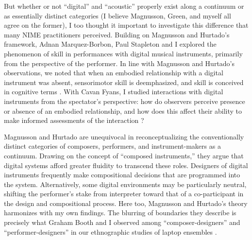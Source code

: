 But whether or not ``digital'' and ``acoustic'' properly exist along a continuum or as essentially distinct categories (I believe Magnusson, Green, and myself all agree on the former), I too thought it important to investigate this difference that many NIME practitioners perceived. Building on Magnusson and Hurtado's framework, Adnan Marquez-Borbon, Paul Stapleton and I explored the phenomenon of skill in performances with digital musical instruments, primarily from the perspective of the performer. In line with Magnusson and Hurtado's observations, we noted that when an embodied relationship with a digital instrument was absent, sensorimotor skill is deemphasized, and skill is conceived in cognitive terms \cite{Gurevich:2012}. With Cavan Fyans, I studied interactions with digital instruments from the spectator's perspective: how do observers perceive presence or absence of an embodied relationship, and how does this affect their ability to make informed assessments of the interaction \cite{Gurevich:2011}? 

Magnusson and Hurtado are unequivocal in reconceptualizing the conventionally distinct categories of composers, performers, and instrument-makers as a continuum. Drawing on the concept of ``composed instruments,'' they argue that digital systems afford greater fluidity to transcend these roles. Designers of digital instruments frequently make compositional decisions that are programmed into the system. Alternatively, some digital environments may be particularly neutral, shifting the performer's stake from interpreter toward that of a co-participant in the design and compositional process. Here too, Magnusson and Hurtado's theory harmonizes with my own findings. The blurring of boundaries they describe is precisely what Graham Booth and I observed among ``composer-designers'' and ``performer-designers'' in our ethnographic studies of laptop ensembles \cite{Booth:2012}.

